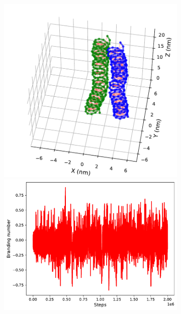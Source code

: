\documentclass[a4paper,10pt]{article}
\begin{document}
\begin{figure}[htbp]
\centering
\begin{subfigure}{.3\textwidth}
\includegraphics[width=\textwidth]{brD_5_2000000.pdf}
\includegraphics[width=\textwidth]{brD_5_brand.pdf}

\end{subfigure}
\end{figure}
\end{document}
